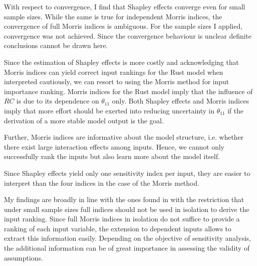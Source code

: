 With respect to convergence, I find that Shapley effects converge even for small sample sizes. While the same is true for independent Morris indices, the convergence of full Morris indices is ambiguous. For the sample sizes I applied, convergence was not achieved. Since the convergence behaviour is unclear definite conclusions cannot be drawn here.

Since the estimation of Shapley effects is more costly and acknowledging that Morris
indices can yield correct input rankings for the Rust model when interpreted cautiously, we can resort to using the Morris
method for input importance ranking. Morris indices for the Rust model imply that the influence of $RC$ is due to its dependence on $\theta_{11}$ only. Both Shapley effects and Morris indices imply that more effort should be exerted into reducing uncertainty in $\theta_{11}$ if the derivation of a more stable model output is the goal.

Further, Morris indices are informative about the model structure, i.e. whether there exist large interaction effects among inputs. Hence, we cannot only successfully rank the inputs but also learn more about the model itself.

Since Shapley effects yield only one sensitivity index per input, they are easier to interpret than the four indices in the case of the Morris method.

My findings are broadly in line with the ones found in \citet{GM17} with the restriction that under small sample sizes full indices should not be used in isolation to derive the input ranking. %
Since full Morris indices in isolation do not suffice to provide a ranking of each input variable, the extension to dependent inputs allows to extract this information easily. Depending on the objective of sensitivity analysis, the additional information can be of great importance in assessing the validity of assumptions.
